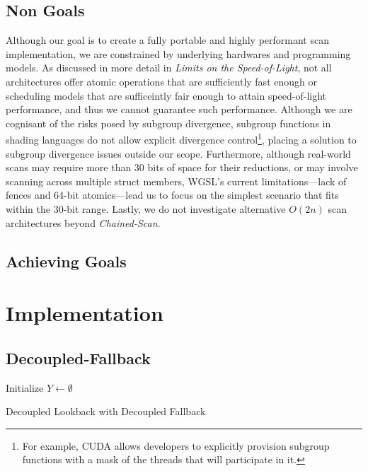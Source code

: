 \documentclass[sigconf]{acmart}
\begin{document}
\subsection{Non Goals}
 Although our goal is to create a fully portable and highly performant scan implementation, we are constrained by underlying hardwares and programming models. As discussed in more detail in \emph{Limits on the Speed-of-Light}, not all architectures offer atomic operations that are sufficiently fast enough or scheduling models that are sufficeintly fair enough to attain speed-of-light performance, and thus we cannot guarantee such performance. Although we are cognisant of the risks posed by subgroup divergence, subgroup functions in shading languages do not allow explicit divergence control\footnote{For example, CUDA allows developers to explicitly provision subgroup functions with a mask of the threads that will participate in it.}, placing a solution to subgroup divergence issues outside our scope. Furthermore, although real-world scans may require more than 30 bits of space for their reductions, or may involve scanning across multiple struct members, WGSL’s current limitations---lack of fences and 64-bit atomics---lead us to focus on the simplest scenario that fits within the 30-bit range. Lastly, we do not investigate alternative $O(2n)$ scan architectures beyond \emph{Chained-Scan}.

\subsection{Achieving Goals}

\section{Implementation}

\subsection{Decoupled-Fallback}

\begin{algorithm}[htbp]
  \SetAlgoLined
  Initialize $Y \leftarrow \emptyset$\;
  \;
  \caption{Decoupled Lookback with Decoupled Fallback}
  \label{alg:example}
\end{algorithm}
\end{document}
